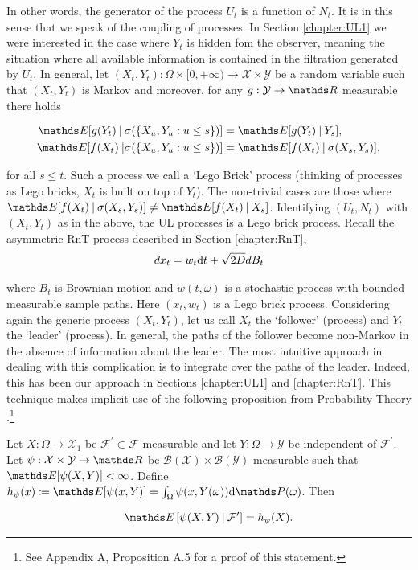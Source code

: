 In other words, the generator of the process $U_t$ is a function of $N_t$. It is in this sense that we speak of the coupling of processes. In Section \ref{chapter:UL1} we were interested in the case where $Y_t$ is hidden fom the observer, meaning the situation where all available information is contained in the filtration generated by $U_t$. In general, let $(X_t,Y_t): \Omega \times [0, +\infty) \rightarrow \mathcal{X}\times \mathcal{Y}$ be a random variable such that $(X_t,Y_t)$ is Markov and moreover, for any $g: \mathcal{Y} \rightarrow \bR$ measurable there holds

\begin{align}
\bE[g(Y_t) \: \lvert \: \sigma(\{X_u,Y_u: u \leq s\})] &= \bE[g(Y_t) \:\lvert \:Y_s], \\
\bE[f(X_t) \: \lvert \sigma(\{X_u,Y_u: u \leq s\})]  &= \bE[f(X_t) \:\lvert \: \sigma(X_s,Y_s) ],
\end{align}

for all $s \leq t$. Such a process we call a `Lego Brick' process (thinking of processes as Lego bricks, $X_t$ is built on top of $Y_t$). The non-trivial cases are those where $\bE[f(X_t) \:\lvert \: \sigma(X_s,Y_s) ] \neq \bE[f(X_t) \:\lvert \: X_s ]$. Identifying $(U_t, N_t)$ with $(X_t, Y_t)$ as in the above, the UL processes is a Lego brick process. Recall the asymmetric RnT process described in Section \ref{chapter:RnT},
\begin{align}
dx_t = w_t \mathrm{d} t + \sqrt{2D}dB_t
\end{align}

where $B_t$ is Brownian motion and $w(t,\omega)$ is a stochastic process with bounded measurable sample paths. Here $(x_t, w_t)$ is a Lego brick process. Considering again the generic process $(X_t, Y_t)$, let us call $X_t$ the `follower' (process) and $Y_t$ the `leader' (process). In general, the paths of the follower become non-Markov in the absence of information about the leader. The most intuitive approach in dealing with this complication is to integrate over the paths of the leader. Indeed, this has been our approach in Sections \ref{chapter:UL1} and \ref{chapter:RnT}. This technique makes implicit use of the following proposition from Probability Theory \cite{XueMeiAltman2020}.\footnote{See Appendix A, Proposition A.5 for a proof of this statement.}

\begin{prop} 
Let $X: \Omega \rightarrow \mathcal{X}_1$ be $\mathcal{F}^\prime \subset \mathcal{F}$ measurable and let $Y: \Omega \rightarrow \mathcal{Y}$ be independent of $\mathcal{F}^\prime$. Let $\psi: \mathcal{X}\times \mathcal{Y} \rightarrow \bR$ be $\mathcal{B}(\mathcal{X}) \times \mathcal{B}(\mathcal{Y})$ measurable such that $\bE \abs{\psi(X,Y)} < \infty$. Define $h_\psi(x) \coloneqq \bE[\psi(x,Y)] = \int_\Omega \psi(x,Y(\omega)) \rmd\bP(\omega)$. Then 

\begin{align}
\bE\left[\psi(X,Y) \: \lvert \: \mathcal{F}^\prime\right] = h_\psi(X).
\end{align}
\end{prop}

